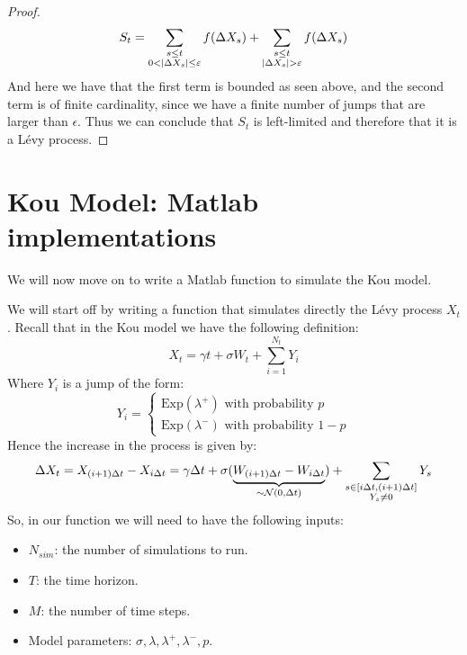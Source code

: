 \begin{proof}
\[ 
    S_t = \sum_{\begin{subarray}{c} s\leq t \\ 0 < |\Delta X_s| \leq \epsilon
    \end{subarray}} f(\Delta X_s) + \sum_{\begin{subarray}{c} s\leq t \\ |\Delta
    X_s| > \epsilon \end{subarray}} f(\Delta X_s)
\]
And here we have that the first term is bounded as seen above, and the second
term is of finite cardinality, since we have a finite number of jumps that are
larger than $\epsilon$. Thus we can conclude that $S_t$ is left-limited and
therefore that it is a L\'evy process.
\end{proof}

\section{Kou Model: Matlab implementations}
We will now move on to write a Matlab function to simulate the Kou model.

We will start off by writing a function that simulates directly the L\'evy
process $X_t$. Recall that in the Kou model we have the
following definition:
\[ X_t = \gamma t + \sigma W_t + \sum_{i=1}^{N_t} Y_i \]
Where $Y_i$ is a jump of the form:
\[ Y_i = \left\{ \begin{array}{l} 
    \text{Exp}(\lambda^+) \text{ with probability } p \\
    \text{Exp}(\lambda^-) \text{ with probability } 1-p
\end{array} \right. \]
Hence the increase in the process is given by:
\[ \Delta X_t = X_{(i+1)\Delta t} - X_{i\Delta t} = \gamma \Delta t + \sigma
    (\underbrace{W_{(i+1) \Delta t} - W_{i\Delta t}}_{
    \sim \mathcal{N}(0, \Delta t)}) + \sum_{\begin{subarray}{c} s\in[i\Delta t,
    (i+1)\Delta t] \\ Y_s \neq 0 \end{subarray}} Y_s \]
So, in our function we will need to have the following inputs:
\begin{itemize}
    \item $N_{sim}$: the number of simulations to run.
    \item $T$: the time horizon.
    \item $M$: the number of time steps.
    \item Model parameters: $\sigma, \lambda, \lambda^+, \lambda^-, p$.
\end{itemize}

